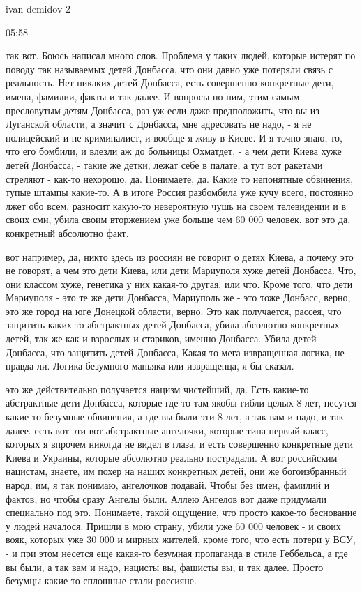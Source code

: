 ivan demidov 2

05:58

так вот. Боюсь написал много слов. Проблема у таких людей, которые истерят по
поводу так называемых детей Донбасса, что они давно уже потеряли связь с
реальность. Нет никаких детей Донбасса, есть совершенно конкретные дети, имена,
фамилии, факты и так далее. И вопросы по ним, этим самым пресловутым детям
Донбасса, раз уж если даже предположить, что вы из Луганской области, а значит
с Донбасса, мне адресовать не надо, - я не полицейский и не криминалист, и
вообще я живу в Киеве. И я точно знаю, то, что его бомбили, и влезли аж до
больницы Охматдет, - а чем дети Киева хуже детей Донбасса, - такие же детки,
лежат себе в палате, а тут вот ракетами стреляют - как-то нехорошо, да.
Понимаете, да. Какие то непонятные обвинения, тупые штампы какие-то. А в итоге
Россия разбомбила уже кучу всего, постоянно лжет обо всем, разносит какую-то
невероятную чушь на своем телевидении и в своих сми, убила своим вторжением уже
больше чем 60 000 человек, вот это да, конкретный абсолютно факт.

вот например, да, никто здесь из россиян не говорит о детях Киева, а почему это
не говорят, а чем это дети Киева, или дети Мариуполя хуже детей Донбасса. Что,
они классом хуже, генетика у них какая-то другая, или что. Кроме того, что дети
Мариуполя - это те же дети Донбасса, Мариуполь же - это тоже Донбасс, верно,
это же город на юге Донецкой области, верно. Это как получается, рассея, что
защитить каких-то абстрактных детей Донбасса, убила абсолютно конкретных детей,
так же как и взрослых и стариков, именно Донбасса. Убила детей Донбасса, что
защитить детей Донбасса, Какая то мега извращенная логика, не правда ли. Логика
безумного маньяка или извращенца, я бы сказал.

это же действительно получается нацизм чистейший, да. Есть какие-то абстрактные
дети Донбасса, которые где-то там якобы гибли целых 8 лет, несутся какие-то
безумные обвинения, а где вы были эти 8 лет, а так вам и надо, и так далее.
есть вот эти вот абстрактные ангелочки, которые типа первый класс, которых я
впрочем никогда не видел в глаза, и есть совершенно конкретные дети Киева и
Украины, которые абсолютно реально пострадали. А вот российским нацистам,
знаете, им похер на наших конкретных детей, они же богоизбранный народ, им, я
так понимаю, ангелочков подавай. Чтобы без имен, фамилий и фактов, но чтобы
сразу Ангелы были. Аллею Ангелов вот даже придумали специально под это.
Понимаете, такой ощущение, что просто какое-то беснование у людей началося.
Пришли в мою страну, убили уже 60 000 человек - и своих вояк, которых уже 30
000 и мирных жителей, кроме того, что есть потери у ВСУ, - и при этом несется
еще какая-то безумная пропаганда в стиле Геббельса, а где вы были, а так вам и
надо, нацисты вы, фашисты вы, и так далее. Просто безумцы какие-то сплошные
стали россияне.
